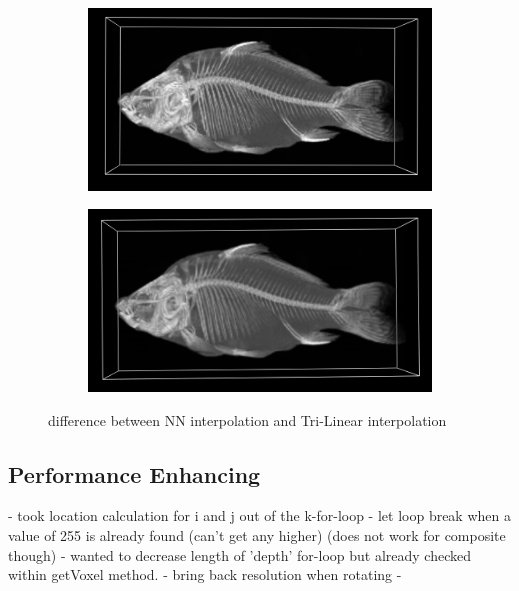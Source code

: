 \begin{figure}[h!]
    \centering
    \captionsetup{justification=centering,margin=0.5cm}
    \begin{subfigure}[t]{0.48\textwidth}
        \includegraphics[width=\textwidth]{img/fish_NN.png}
        \caption{ }
    \end{subfigure}
    \begin{subfigure}[t]{0.48\textwidth}
        \includegraphics[width=\textwidth]{img/fish_TriLin.png}
        \caption{ }
    \end{subfigure}
    \caption{difference between NN interpolation and Tri-Linear interpolation}
    \label{fig:trilinear}
\end{figure}

\subsection{Performance Enhancing}\label{subsec:perf_enh}

- took location calculation for i and j out of the k-for-loop
- let loop break when a value of 255 is already found (can't get any higher) (does not work for composite though)
- wanted to decrease length of 'depth' for-loop but already checked within getVoxel method.
- bring back resolution when rotating
- 

